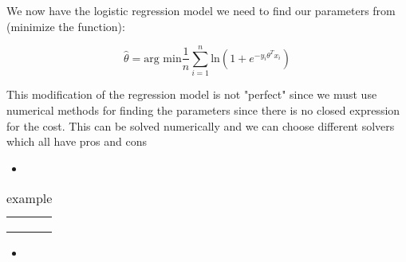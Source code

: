 \documentclass[a4paper]{article}
\begin{document}
We now have the logistic regression model we need to find our parameters from (minimize the function):

\begin{equation}
\hat{\theta} = \text{arg min} \frac{1} {n} \sum_{i=1}^{n} \text{ln}(1+e^{-y_i\theta^{T}x_i})
\end{equation}

This modification of the regression model is not "perfect" since we must use numerical methods for finding the parameters since there is no closed expression for the cost. This can be solved numerically and we can choose different solvers which all have pros and cons

\begin{itemize}
    \item 
\end{itemize}

\begin{table}[ht!]
\centering
\begin{tabular}{lll}\hline
 &  &  \\
 &  &  \\
 &  & \\ \hline
\end{tabular}
\caption{example}
\label{tab:tab1}
\end{table}

\begin{itemize}
    \item 
\end{itemize}




\end{document}
